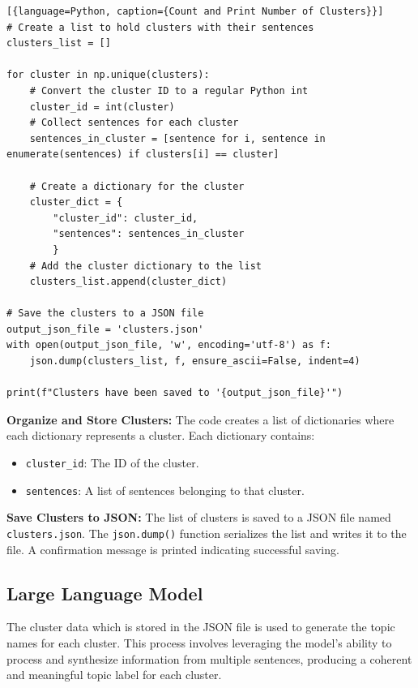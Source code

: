 \begin{lstlisting}[{language=Python, caption={Count and Print Number of Clusters}}]
# Create a list to hold clusters with their sentences
clusters_list = []

for cluster in np.unique(clusters):
    # Convert the cluster ID to a regular Python int
    cluster_id = int(cluster)
    # Collect sentences for each cluster
    sentences_in_cluster = [sentence for i, sentence in enumerate(sentences) if clusters[i] == cluster]
    
    # Create a dictionary for the cluster
    cluster_dict = {
        "cluster_id": cluster_id,
        "sentences": sentences_in_cluster
        }
    # Add the cluster dictionary to the list
    clusters_list.append(cluster_dict)
    
# Save the clusters to a JSON file
output_json_file = 'clusters.json'
with open(output_json_file, 'w', encoding='utf-8') as f:
    json.dump(clusters_list, f, ensure_ascii=False, indent=4)

print(f"Clusters have been saved to '{output_json_file}'")
\end{lstlisting}

\noindent\textbf{Organize and Store Clusters:} The code creates a list of dictionaries where each dictionary represents a cluster. Each dictionary contains:
\begin{itemize}
    \item \texttt{cluster\_id}: The ID of the cluster.
    \item \texttt{sentences}: A list of sentences belonging to that cluster.
\end{itemize}

\noindent\textbf{Save Clusters to JSON:} The list of clusters is saved to a JSON file named \texttt{clusters.json}. 
The \texttt{json.dump()} function serializes the list and writes it to the file. A confirmation message is printed indicating successful saving.



\subsection{Large Language Model}

The cluster data which is stored in the JSON file is used to generate the topic names for each cluster. This process involves leveraging the model’s ability to process and synthesize information from multiple sentences,
producing a coherent and meaningful topic label for each cluster.


